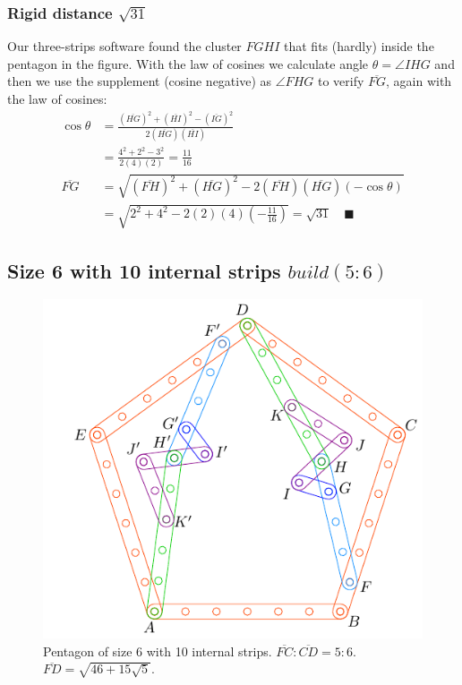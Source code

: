 \documentclass[11pt]{article}
\begin{document}
\subsubsection{Rigid distance $\sqrt{31}$}

Our three-strips software found the cluster $FGHI$ that fits (hardly) inside the pentagon in the figure. With the law of cosines we calculate angle $\theta = \angle{IHG}$ and then we use the supplement (cosine negative) as $\angle{FHG}$ to verify $\overline{FG}$, again with the law of cosines:
\begin{align}
\cos\theta &= \frac{(\overline{HG})^2 + (\overline{HI})^2 - (\overline{IG})^2}
 {2(\overline{HG})(\overline{HI})} \nonumber\\
 &= \frac{4^2 + 2^2 - 3^2}{2(4)(2)} = \frac{11}{16} \\
\overline{FG} &= \sqrt{(\overline{FH})^2 + (\overline{HG})^2 
 - 2(\overline{FH})(\overline{HG})(-\cos\theta) } \nonumber\\
 &= \sqrt{2^2 + 4^2 - 2(2)(4)\left(-\frac{11}{16}\right)}
 = \sqrt{31} \quad \blacksquare
\end{align}

\subsection{Size 6 with 10 internal strips $build(5:6)$}

\begin{figure}[h]
\centering
\includegraphics[scale=1]{6/penta6-10a}
\caption{Pentagon of size 6 with 10 internal strips. $\overline{FC} : \overline{CD} = 5:6$. $\overline{FD} = \sqrt{46 + 15\sqrt5}$.}
\label{fig:penta6-10a}
\end{figure}
\end{document}
